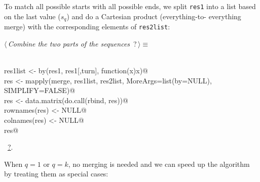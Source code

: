 \documentclass[reqno]{amsart}
\renewcommand{\NWtarget}[2]{\hypertarget{#1}{#2}}
\renewcommand{\NWlink}[2]{\hyperlink{#1}{#2}}
\begin{document}
To match all possible starts with all possible ends, we split \texttt{res1} into
a list based on the last value ($s_q$) and do a Cartesian product (everything-to-
everything merge) with the corresponding elements of \texttt{res2list}:
\begin{flushleft} \small
\begin{minipage}{\linewidth}\label{scrap19}\raggedright\small
\NWtarget{nuweb?}{} $\langle\,${\itshape Combine the two parts of the sequences}\nobreak\ {\footnotesize {?}}$\,\rangle\equiv$
\vspace{-1ex}
\begin{list}{}{} \item
\mbox{}\verb@@\\
\mbox{}\verb@  res1list <- by(res1, res1[,turn], function(x)x)@\\
\mbox{}\verb@  res <- mapply(merge, res1list, res2list, MoreArgs=list(by=NULL), SIMPLIFY=FALSE)@\\
\mbox{}\verb@  res <- data.matrix(do.call(rbind, res))@\\
\mbox{}\verb@  rownames(res) <- NULL@\\
\mbox{}\verb@  colnames(res) <- NULL@\\
\mbox{}\verb@  res@\\
\mbox{}\verb@@{\NWsep}
\end{list}
\vspace{-1.5ex}
\footnotesize
\begin{list}{}{\setlength{\itemsep}{-\parsep}\setlength{\itemindent}{-\leftmargin}}
\item \NWtxtMacroRefIn\ \NWlink{nuweb?}{?}.

\item{}
\end{list}
\end{minipage}\vspace{4ex}
\end{flushleft}
When $q=1$ or $q=k$, no merging is needed and we can speed up the algorithm by
treating them as special cases:
\end{document}
